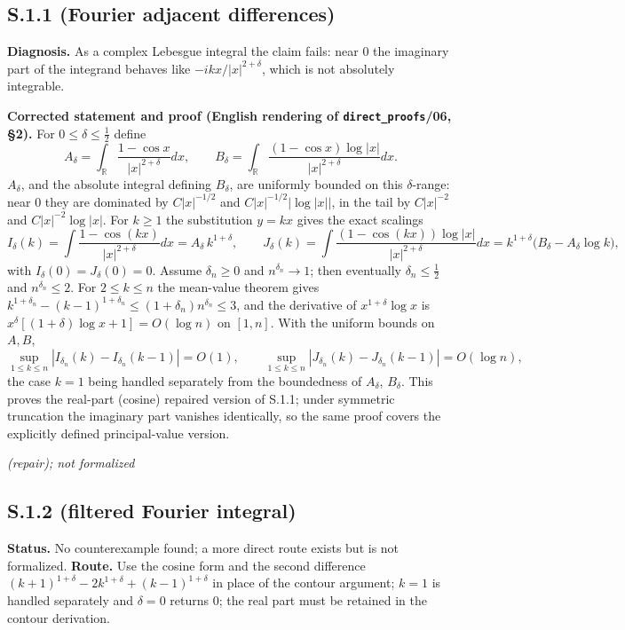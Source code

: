 \documentclass[11pt]{article}
\theoremstyle{definition}
\theoremstyle{remark}
\newcommand{\statustag}[1]{%
  \par\nobreak\begingroup\footnotesize\itshape\raggedleft #1\par\endgroup}
\newcommand{\Wwritten}{[written]}
\begin{document}
\subsection{S.1.1 (Fourier adjacent differences)}
\textbf{Diagnosis.} As a complex Lebesgue integral the claim fails: near
$0$ the imaginary part of the integrand behaves like $-ikx/|x|^{2+\delta}$,
which is not absolutely integrable.

\textbf{Corrected statement and proof (English rendering of
\texttt{direct\_proofs}/06, \S2).} For $0\le\delta\le\tfrac12$ define
\[
A_\delta=\int_{\mathbb R}\frac{1-\cos x}{|x|^{2+\delta}}dx,
\qquad
B_\delta=\int_{\mathbb R}\frac{(1-\cos x)\log|x|}{|x|^{2+\delta}}dx .
\]
$A_\delta$, and the absolute integral defining $B_\delta$, are uniformly
bounded on this $\delta$-range: near $0$ they are dominated by
$C|x|^{-1/2}$ and $C|x|^{-1/2}|\log|x||$, in the tail by $C|x|^{-2}$ and
$C|x|^{-2}\log|x|$. For $k\ge1$ the substitution $y=kx$ gives the exact
scalings
\[
I_\delta(k)=\int\frac{1-\cos(kx)}{|x|^{2+\delta}}dx=A_\delta\,k^{1+\delta},
\qquad
J_\delta(k)=\int\frac{(1-\cos(kx))\log|x|}{|x|^{2+\delta}}dx
=k^{1+\delta}\bigl(B_\delta-A_\delta\log k\bigr),
\]
with $I_\delta(0)=J_\delta(0)=0$. Assume $\delta_n\ge0$ and
$n^{\delta_n}\to1$; then eventually $\delta_n\le\tfrac12$ and
$n^{\delta_n}\le2$. For $2\le k\le n$ the mean-value theorem gives
$k^{1+\delta_n}-(k-1)^{1+\delta_n}\le(1+\delta_n)n^{\delta_n}\le3$, and the
derivative of $x^{1+\delta}\log x$ is
$x^{\delta}[(1+\delta)\log x+1]=O(\log n)$ on $[1,n]$. With the uniform
bounds on $A,B$,
\[
\sup_{1\le k\le n}|I_{\delta_n}(k)-I_{\delta_n}(k-1)|=O(1),
\qquad
\sup_{1\le k\le n}|J_{\delta_n}(k)-J_{\delta_n}(k-1)|=O(\log n),
\]
the case $k=1$ being handled separately from the boundedness of $A_\delta$,
$B_\delta$. This proves the real-part (cosine) repaired version of S.1.1;
under symmetric truncation the imaginary part vanishes identically, so the
same proof covers the explicitly defined principal-value version.
\statustag{\Wwritten (repair); not formalized}

\smallskip{}

\subsection{S.1.2 (filtered Fourier integral)}
\textbf{Status.} No counterexample found; a more direct route exists but is
not formalized. \textbf{Route.} Use the cosine form and the second difference
$(k+1)^{1+\delta}-2k^{1+\delta}+(k-1)^{1+\delta}$ in place of the contour
argument; $k=1$ is handled separately and $\delta=0$ returns $0$; the real
part must be retained in the contour derivation.
\end{document}
